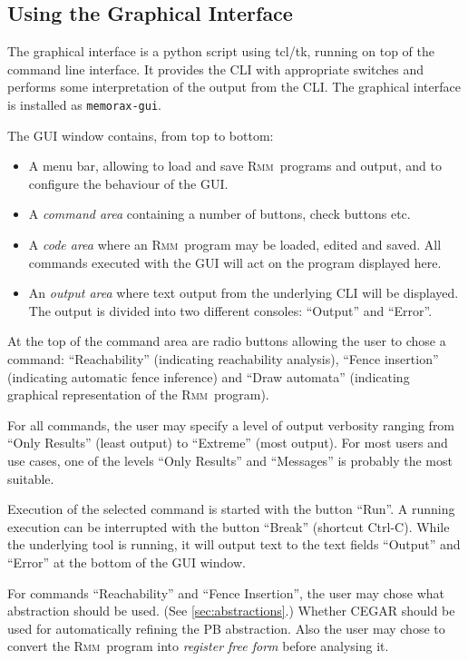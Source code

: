 \documentclass[a4paper]{article}
\newcommand{\rmm}{\textsc{Rmm}}
\newcommand{\gui}{memorax-gui} %
\begin{document}
\subsection{Using the Graphical Interface}

The graphical interface is a python script using tcl/tk, running on
top of the command line interface. It provides the CLI with
appropriate switches and performs some interpretation of the output
from the CLI. The graphical interface is installed as {\tt \gui{}}.

The GUI window contains, from top to bottom:

\begin{itemize}
\item A menu bar, allowing to load and save \rmm\ programs and output,
  and to configure the behaviour of the GUI.
\item A \emph{command area} containing a number of buttons, check buttons etc.
\item A \emph{code area} where an \rmm\ program may be loaded, edited
  and saved. All commands executed with the GUI will act on the
  program displayed here.
\item An \emph{output area} where text output from the underlying CLI
  will be displayed. The output is divided into two different
  consoles: ``Output'' and ``Error''.
\end{itemize}

At the top of the command area are radio buttons allowing the user to
chose a command: ``Reachability'' (indicating reachability analysis),
``Fence insertion'' (indicating automatic fence inference) and ``Draw
automata'' (indicating graphical representation of the \rmm\ program).

For all commands, the user may specify a level of output verbosity
ranging from ``Only Results'' (least output) to ``Extreme'' (most
output). For most users and use cases, one of the levels ``Only
Results'' and ``Messages'' is probably the most suitable.

Execution of the selected command is started with the button
``Run''. A running execution can be interrupted with the button
``Break'' (shortcut Ctrl-C). While the underlying tool is running, it
will output text to the text fields ``Output'' and ``Error'' at the
bottom of the GUI window.

For commands ``Reachability'' and ``Fence Insertion'', the user may
chose what abstraction should be used. (See \cref{sec:abstractions}.)
Whether CEGAR should be used for automatically refining the PB
abstraction. Also the user may chose to convert the \rmm\ program into
\emph{register free form} before analysing it. \explainrff
\end{document}

